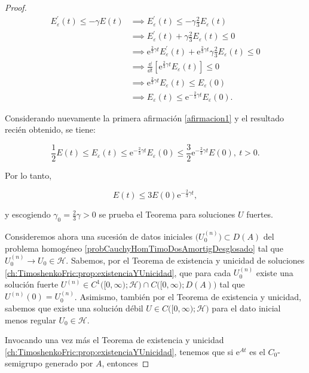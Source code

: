 \begin{proof}
    \begin{align*}
        E^\prime_\varepsilon(t) \leq -\gamma E(t) &\implies E^\prime_\varepsilon(t) \leq -\gamma\frac{2}{3} E_\varepsilon(t)\\
        &\implies E^\prime_\varepsilon(t) + \gamma\frac{2}{3} E_\varepsilon(t) \leq 0\\
        &\implies \mathrm{e}^{\frac{2}{3}\gamma t}E^\prime_\varepsilon(t) + \mathrm{e}^{\frac{2}{3}\gamma t}\gamma\frac{2}{3} E_\varepsilon(t) \leq 0\\
        &\implies \frac{\dd}{\dd t}\left[\mathrm{e}^{\frac{2}{3}\gamma t}E_\varepsilon(t)\right] \leq 0\\
        &\implies \mathrm{e}^{\frac{2}{3}\gamma t}E_\varepsilon(t) \leq E_\varepsilon(0)\\
        &\implies E_\varepsilon(t) \leq \mathrm{e}^{-\frac{2}{3}\gamma t}E_\varepsilon(0).
    \end{align*}

    Considerando nuevamente la primera afirmación \eqref{afirmacion1} y el resultado recién obtenido, se tiene:

    \[\frac{1}{2}E(t) \leq E_\varepsilon(t) \leq \mathrm{e}^{-\frac{2}{3}\gamma t}E_\varepsilon(0) \leq \frac{3}{2}\mathrm{e}^{-\frac{2}{3}\gamma t}E(0), \ t > 0.\]

    Por lo tanto,

    \[E(t) \leq 3E(0)\mathrm{e}^{-\frac{2}{3}\gamma t},\]

    y escogiendo $\displaystyle\gamma_0 = \frac{2}{3}\gamma > 0$ se prueba el Teorema para soluciones $U$ fuertes.
    
    Consideremos ahora una sucesión de datos iniciales $\Big(U_0^{(n)}\Big) \subset D(A)$ del problema homogéneo \eqref{probCauchyHomTimoDosAmortigDesglosado} tal que $U_0^{(n)} \rightarrow U_0 \in \mathcal{H}$. Sabemos, por el Teorema de existencia y unicidad de soluciones \ref{ch:TimoshenkoFric:prop:existenciaYUnicidad}, que para cada $U_0^{(n)}$ existe una solución fuerte $U^{(n)} \in C^1\big([0, \infty); \mathcal{H}\big) \cap C\big([0,\infty);D(A)\big)$ tal que $U^{(n)}(0) = U_0^{(n)}$. Asimismo, también por el Teorema de existencia y unicidad, sabemos que existe una solución débil $U \in C\big([0,\infty); \mathcal{H}\big)$ para el dato inicial menos regular $U_0 \in \mathcal{H}$.

    Invocando una vez más el Teorema de existencia y unicidad \ref{ch:TimoshenkoFric:prop:existenciaYUnicidad}, tenemos que si $\mathrm{e}^{At}$ es el $C_0$-semigrupo generado por $A$, entonces


\end{proof}
